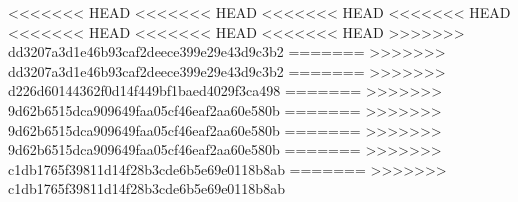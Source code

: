 \documentclass[11pt, a4paper]{article}
\begin{document}
        

<<<<<<< HEAD
<<<<<<< HEAD
<<<<<<< HEAD
<<<<<<< HEAD
<<<<<<< HEAD
<<<<<<< HEAD
<<<<<<< HEAD
>>>>>>> dd3207a3d1e46b93caf2deece399e29e43d9c3b2
=======
>>>>>>> dd3207a3d1e46b93caf2deece399e29e43d9c3b2
=======
>>>>>>> d226d60144362f0d14f449bf1baed4029f3ca498
=======
>>>>>>> 9d62b6515dca909649faa05cf46eaf2aa60e580b
=======
>>>>>>> 9d62b6515dca909649faa05cf46eaf2aa60e580b
=======
>>>>>>> 9d62b6515dca909649faa05cf46eaf2aa60e580b
=======
>>>>>>> c1db1765f39811d14f28b3cde6b5e69e0118b8ab
=======
>>>>>>> c1db1765f39811d14f28b3cde6b5e69e0118b8ab
    
    
\end{document}
